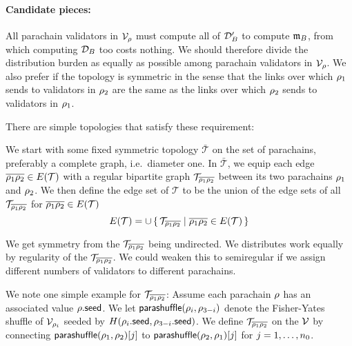 \smallskip
\paragraph{Candidate pieces:}

All parachain validators in $\mathcal{V}_{\rho}$ must compute all of $\mathcal{D}'_B$ to compute $\mathfrak{m}_B$, from which computing $\mathcal{D}_B$ too costs nothing.  We should therefore divide the distribution burden as equally as possible among parachain validators in $\mathcal{V}_{\rho}$.  We also prefer if the topology is symmetric in the sense that the links over which $\rho_1$ sends to validators in $\rho_2$ are the same as the links over which $\rho_2$ sends to validators in $\rho_1$.  


There are simple topologies that satisfy these requirement:

We start with some fixed symmetric topology $\bar{\mathcal{T}}$ on the set of parachains, preferably a complete graph, i.e.\ diameter one.  In $\bar{\mathcal{T}}$, we equip each edge $\overline{\rho_1 \rho_2} \in E(\mathcal{T})$ with a regular bipartite graph $\mathcal{T}_{\overline{\rho_1 \rho_2}}$ between its two parachains $\rho_1$ and $\rho_2$.  We then define the edge set of $\mathcal{T}$ to be the union of the edge sets of all $\mathcal{T}_{\overline{\rho_1 \rho_2}}$ for $\overline{\rho_1 \rho_2} \in E(\mathcal{T})$
$$ E(\mathcal{T}) = \cup \Setst{ \mathcal{T}_{\overline{\para_1 \para_2}} }{ \overline{\para_1 \para_2} \in E(\mathcal{T}) } $$

We get symmetry from the $\mathcal{T}_{\overline{\rho_1 \rho_2}}$ being undirected.  We distributes work equally by regularity of the $\mathcal{T}_{\overline{\rho_1 \rho_2}}$.  We could weaken this to semiregular if we assign different numbers of validators to different parachains.

We note one simple example for $\mathcal{T}_{\overline{\rho_1 \rho_2}}$:  
Assume each parachain $\rho$ has an associated value $\rho.\mathsf{seed}$.  We let $\mathsf{parashuffle}(\rho_i,\rho_{3-i})$ denote the Fisher-Yates shuffle of $\mathcal{V}_{\rho_i}$ seeded by $H( \rho_i.\mathsf{seed}, \rho_{3-i}.\mathsf{seed} )$.  We define $\mathcal{T}_{\overline{\rho_1 \rho_2}}$ on the $\mathcal{V}$ by connecting $\mathsf{parashuffle}(\rho_1,\rho_2)[j]$ to $\mathsf{parashuffle}(\rho_2,\rho_1)[j]$ for $j = 1,\ldots,n_0$.


